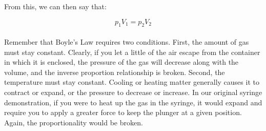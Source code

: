 
From this, we can then say that:

\begin{equation*}
p_{1}V_{1} = p_{2}V_{2}
\end{equation*}
\\
Remember that Boyle's Law requires two conditions. First, the amount of gas must stay constant. Clearly, if you let a little of the air escape from the container in which it is enclosed, the pressure of the gas will decrease along with the volume, and the inverse proportion relationship is broken. Second, the temperature must stay constant. Cooling or heating matter generally causes it to contract or expand, or the pressure to decrease or increase. In our original syringe demonstration, if you were to heat up the gas in the syringe, it would expand and require you to apply a greater force to keep the plunger at a given position. Again, the proportionality would be broken.



